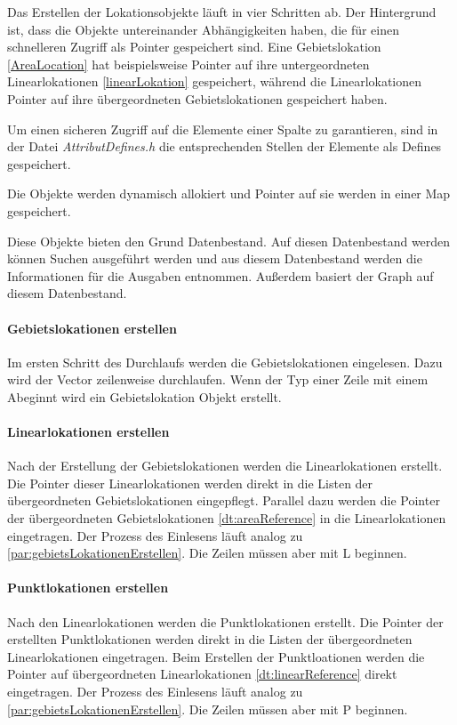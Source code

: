 \documentclass[12pt, a4paper, ngerman]{article}
\begin{document}
Das Erstellen der Lokationsobjekte läuft in vier Schritten ab. Der Hintergrund ist, dass die Objekte untereinander Abhängigkeiten haben, die für einen schnelleren Zugriff als Pointer gespeichert sind. Eine Gebietslokation  \ref{AreaLocation} hat beispielsweise Pointer auf ihre untergeordneten Linearlokationen \ref{linearLokation} gespeichert, während die Linearlokationen Pointer auf ihre übergeordneten Gebietslokationen gespeichert haben.

Um einen sicheren Zugriff auf die Elemente einer Spalte zu garantieren, sind in der Datei \textit{AttributDefines.h} die entsprechenden Stellen der Elemente als Defines gespeichert.

Die Objekte werden dynamisch allokiert und Pointer auf sie werden in einer Map gespeichert.  

Diese Objekte bieten den Grund Datenbestand. Auf diesen Datenbestand werden können Suchen ausgeführt werden und aus diesem Datenbestand werden die Informationen für die Ausgaben entnommen. Außerdem basiert der Graph auf diesem Datenbestand.

\paragraph{Gebietslokationen erstellen \label{par:gebietsLokationenErstellen}}
Im ersten Schritt des Durchlaufs werden die Gebietslokationen eingelesen. Dazu wird der Vector zeilenweise durchlaufen. Wenn der Typ einer Zeile mit einem \glqq A\grqq  beginnt wird ein Gebietslokation Objekt erstellt.

\paragraph{Linearlokationen erstellen}
Nach der Erstellung der Gebietslokationen werden die Linearlokationen erstellt. Die Pointer dieser Linearlokationen werden direkt in die Listen der übergeordneten Gebietslokationen eingepflegt. Parallel dazu werden die Pointer der übergeordneten Gebietslokationen \ref{dt:areaReference} in die Linearlokationen eingetragen. Der Prozess des Einlesens läuft analog zu \ref{par:gebietsLokationenErstellen}. Die Zeilen müssen aber mit \glqq L \grqq beginnen. 

\paragraph{Punktlokationen erstellen}
Nach den Linearlokationen werden die Punktlokationen erstellt. Die Pointer der erstellten Punktlokationen werden direkt in die Listen der übergeordneten Linearlokationen eingetragen. Beim Erstellen der Punktloationen werden die Pointer auf übergeordneten Linearlokationen \ref{dt:linearReference} direkt eingetragen. Der Prozess des Einlesens läuft analog zu \ref{par:gebietsLokationenErstellen}. Die Zeilen müssen aber mit \glqq P \grqq beginnen. 
\end{document}
